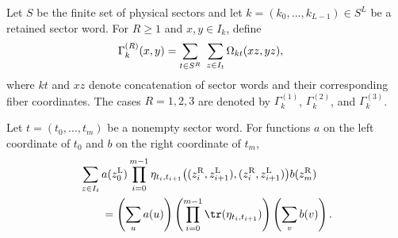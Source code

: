 \begin{definition}
    \label{def:mpdo_suffix_sector_contraction}
    \leanok
    Let $S$ be the finite set of physical sectors and let
    $k=(k_0,\ldots,k_{L-1})\in S^L$ be a retained sector word. For
    $R\geq1$ and $x,y\in I_k$, define
    \begin{align}
        \Gamma_k^{(R)}(x,y)
         & =
        \sum_{t\in S^R}\ \sum_{z\in I_t}
        \Omega_{kt}(xz,yz),
        \notag
    \end{align}
    where $kt$ and $xz$ denote concatenation of sector words and their
    corresponding fiber coordinates. The cases $R=1,2,3$ are denoted by
    $\Gamma_k^{(1)}$, $\Gamma_k^{(2)}$, and $\Gamma_k^{(3)}$.
\end{definition}

\begin{lemma}
    \label{thm:mpdo_sector_chain_fiber_contraction}
    \leanok
    Let $t=(t_0,\ldots,t_m)$ be a nonempty sector word. For functions
    $a$ on the left coordinate of $t_0$ and $b$ on the right coordinate of
    $t_m$,
    \begin{align}
         & \sum_{z\in I_t}
        a(z_0^{\mathrm L})
        \prod_{i=0}^{m-1}
        \eta_{t_i,t_{i+1}}
        \bigl((z_i^{\mathrm R},z_{i+1}^{\mathrm L}),
        (z_i^{\mathrm R},z_{i+1}^{\mathrm L})\bigr)
        b(z_m^{\mathrm R})
        \notag             \\
         & \qquad=
        \left(\sum_u a(u)\right)
        \left(\prod_{i=0}^{m-1}\tr(\eta_{t_i,t_{i+1}})\right)
        \left(\sum_v b(v)\right).
    \end{align}
\end{lemma}

